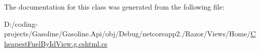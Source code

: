 The documentation for this class was generated from the following file\+:\begin{DoxyCompactItemize}
\item 
D\+:/coding-\/projects/\+Gasoline/\+Gasoline.\+Api/obj/\+Debug/netcoreapp2./\+Razor/\+Views/\+Home/\mbox{\hyperlink{_cheapest_fuel_by_id_view_8g_8cshtml_8cs}{Cheapest\+Fuel\+By\+Id\+View.\+g.\+cshtml.\+cs}}\end{DoxyCompactItemize}
